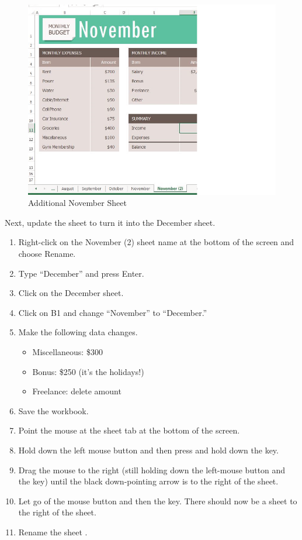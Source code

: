 \begin{figure}[H]
	\centering
	\includegraphics[width=\maxwidth{.95\linewidth}]{gfx/ch06_fig02}
	\caption{Additional November Sheet}
	\label{06:fig02}
\end{figure}

Next, update the  sheet to turn it into the December sheet.

\begin{enumerate}
	\item Right-click on the November (2) sheet name at the bottom of the screen and choose Rename.
	\item Type ``December'' and press Enter.
	\item Click on the December sheet.
	\item Click on B1 and change ``November'' to ``December.''
	\item Make the following data changes.

	\begin{itemize}
		\item Miscellaneous: \$300
		\item Bonus: \$250 (it's the holidays!)
		\item Freelance: delete amount
	\end{itemize}

	\item Save the workbook.
	\item Point the mouse at the  sheet tab at the bottom of the screen.
	\item Hold down the left mouse button and then press and hold down the  key.
	\item Drag the mouse to the right (still holding down the left-mouse button and the  key) until the black down-pointing arrow is to the right of the  sheet.
	\item Let go of the mouse button and then the  key. There should now be a  sheet to the right of the  sheet.
	\item Rename the  sheet .
\end{enumerate}

